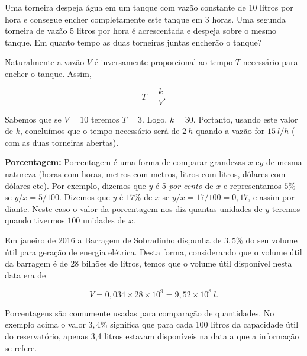 \begin{exemplo} Uma torneira despeja água em um tanque com vazão constante de 10 litros por hora e consegue encher completamente este tanque em 3 horas. Uma segunda torneira de vazão 5 litros por hora é acrescentada e despeja sobre o mesmo tanque. Em quanto tempo as duas torneiras juntas encherão o tanque?

Naturalmente a vazão $V$ é inversamente proporcional ao tempo $T$ necessário para encher o tanque. Assim,

$$T=\frac{k}{V}.$$

Sabemos que se $V=10$ teremos $T=3$. Logo, $k=30$. Portanto, usando este valor de $k$, concluímos que o tempo necessário será de $2\ h$ quando a vazão for  $15\  l/h$ ( com as duas torneiras abertas).

\end{exemplo}

\noindent\textbf{Porcentagem:} Porcentagem é uma forma de comparar grandezas $x$ e$ y$ de mesma natureza (horas com horas, metros com metros, litros com litros, dólares com dólares etc).  Por exemplo, dizemos que $y$ é 5 \textit{por cento} de $x$ e representamos $5\%$  se $y/x=5/100$. Dizemos que $y$ é $17\%$ de $x$  se $y/x=17/100=0,17$, e assim por diante. Neste caso
o valor da porcentagem nos diz quantas unidades de $y$ teremos quando tivermos $100$ unidades de $x$.

\begin{exemplo} Em janeiro de 2016 a Barragem de Sobradinho dispunha de $3,5\%$ do seu volume útil para geração de energia elétrica.
Desta forma, considerando que o volume útil da barragem é de 28 bilhões de litros, temos que o volume útil disponível nesta data era de

$$V=0,034\times28\times10^9=9,52\times10^8 \ l.$$
\end{exemplo}

Porcentagens são comumente usadas para comparação de quantidades.  No exemplo acima o valor $3,4\%$ significa que
para cada 100 litros da capacidade útil do reservatório, apenas 3,4 litros estavam disponíveis na data a que a informação se refere.

